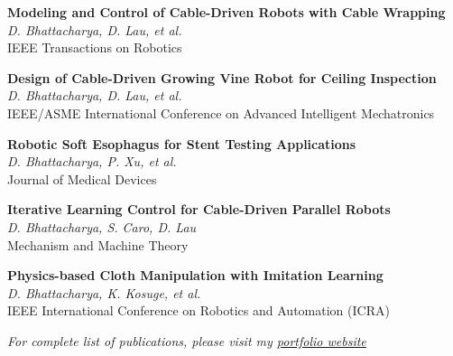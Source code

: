 \documentclass[11pt,a4paper]{article}
\newcommand{\publication}[3]{
  \textbf{#1}\\
  \textit{#2}\\
  #3
  \vspace{0.2cm}
}
\begin{document}
\publication{Modeling and Control of Cable-Driven Robots with Cable Wrapping}{D. Bhattacharya, D. Lau, et al.}{IEEE Transactions on Robotics}

\publication{Design of Cable-Driven Growing Vine Robot for Ceiling Inspection}{D. Bhattacharya, D. Lau, et al.}{IEEE/ASME International Conference on Advanced Intelligent Mechatronics}

\publication{Robotic Soft Esophagus for Stent Testing Applications}{D. Bhattacharya, P. Xu, et al.}{Journal of Medical Devices}

\publication{Iterative Learning Control for Cable-Driven Parallel Robots}{D. Bhattacharya, S. Caro, D. Lau}{Mechanism and Machine Theory}

\publication{Physics-based Cloth Manipulation with Imitation Learning}{D. Bhattacharya, K. Kosuge, et al.}{IEEE International Conference on Robotics and Automation (ICRA)}

\vspace{0.5cm}

\begin{center}
\textit{For complete list of publications, please visit my \href{https://bhattner143.github.io/dips/}{portfolio website}}
\end{center}
\end{document}
